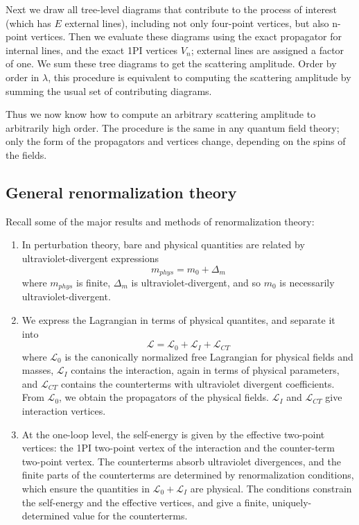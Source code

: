 Next we draw all tree-level diagrams that contribute to the process of interest (which has $E$ external lines), including not only four-point vertices, but also n-point vertices. Then we evaluate these diagrams using the exact propagator for internal lines, and the exact 1PI vertices $V_n$; external lines are assigned a factor of one. We sum these tree diagrams to get the scattering amplitude. Order by order in $\lambda$, this procedure is equivalent to computing the scattering amplitude by summing the usual set of contributing diagrams.

Thus we now know how to compute an arbitrary scattering amplitude
to arbitrarily high order. The procedure is the same in any quantum field theory; only the form of the propagators and vertices change, depending on the spins of the fields.

\subsection{General renormalization theory}
Recall some of the major results and methods of renormalization theory:
\begin{enumerate}
\item In perturbation theory, bare and physical quantities are related by ultraviolet-divergent expressions
\[m_{phys} = m_0 + \Delta_m\]
where $m_{phys}$ is finite, $\Delta_m$ is ultraviolet-divergent, and so $m_0$ is necessarily ultraviolet-divergent.
\item We express the Lagrangian in terms of physical quantites, and separate it into
\[\mathcal{L} = \mathcal{L}_0 + \mathcal{L}_I + \mathcal{L}_{CT}\]
where $\mathcal{L}_0$ is the canonically normalized free Lagrangian for physical fields and masses, $\mathcal{L}_I$ contains the interaction, again in terms of physical parameters, and $\mathcal{L}_{CT}$ contains the counterterms with ultraviolet divergent coefficients. From $\mathcal{L}_0$, we obtain the propagators of the physical fields. $\mathcal{L}_I$ and $\mathcal{L}_{CT}$ give
interaction vertices.
\item At the one-loop level, the self-energy is given by the effective two-point vertices: the 1PI two-point vertex of the interaction and the counter-term two-point vertex. The counterterms absorb ultraviolet divergences, and the finite parts of the counterterms are determined by renormalization conditions,
which ensure the quantities in $\mathcal{L}_0 + \mathcal{L}_I$ are physical. The conditions constrain the self-energy and the effective vertices, and give a finite, uniquely-determined value for the counterterms.
\end{enumerate}
